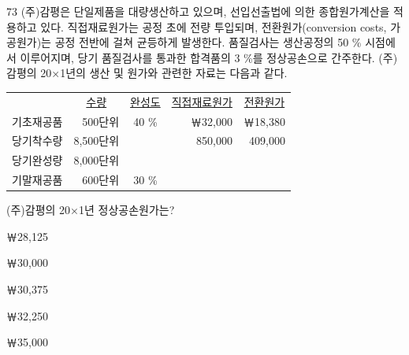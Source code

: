 \begin{question}{73}
(주)감평은 단일제품을 대량생산하고 있으며, 선입선출법에 의한 종합원가계산을 적용하고 있다. 직접재료원가는 공정 초에 전량 투입되며, 전환원가(conversion costs, 가공원가)는 공정 전반에 걸쳐 균등하게 발생한다. 품질검사는 생산공정의 50 \% 시점에서 이루어지며, 당기 품질검사를 통과한 합격품의 3 \%를 정상공손으로 간주한다.
(주)감평의 20×1년의 생산 및 원가와 관련한 자료는 다음과 같다.
\begin{tcolorbox}[enhanced, colback=white, colframe=black, boxrule=0.4pt, arc=0pt, left=4pt, right=4pt, top=4pt, bottom=4pt]
\begin{tabular}{@{}l r c r r@{}}
 & \multicolumn{1}{c}{\uline{\hspace{1em}수량\hspace{1em}}} & \uline{\hspace{1em}완성도\hspace{1em}} & \multicolumn{1}{c}{\uline{\hspace{1em}직접재료원가\hspace{1em}}} & \multicolumn{1}{c}{\uline{\hspace{1em}전환원가\hspace{1em}}} \\
기초재공품 & 500단위 & 40 \% & ￦32,000 & ￦18,380 \\
당기착수량 & 8,500단위 & & 850,000 & 409,000 \\
당기완성량 & 8,000단위 & & & \\
기말재공품 & 600단위 & 30 \% & &
\end{tabular}
\end{tcolorbox}
(주)감평의 20×1년 정상공손원가는?
\begin{choices}
  \item ￦28,125
  \item ￦30,000
  \item ￦30,375
  \item ￦32,250
  \item ￦35,000
\end{choices}
\end{question}
